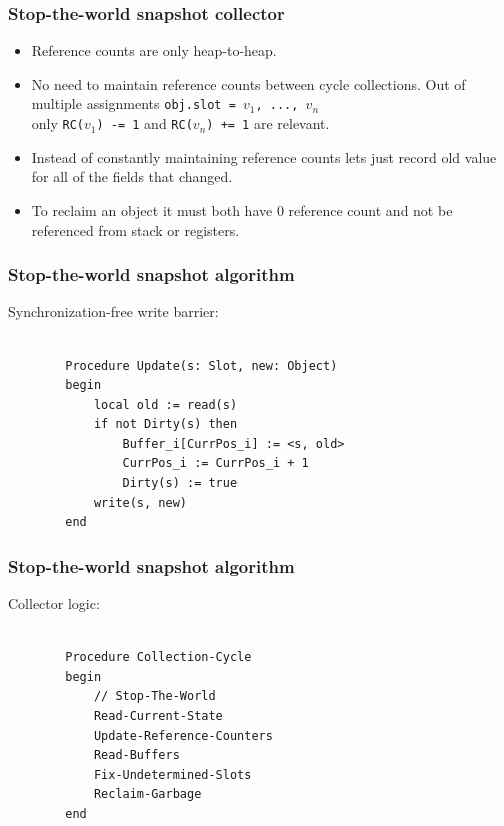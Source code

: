 \begin{frame}
    \frametitle{Stop-the-world snapshot collector}
    \begin{itemize}
        \item
            Reference counts are only heap-to-heap.
        \item
            No need to maintain reference counts between cycle collections.
            Out of multiple assignments \texttt{obj.slot = $v_1$, ..., $v_n$}
            \\ only \texttt{RC($v_1$) -= 1} and \texttt{RC($v_n$) += 1}
            are relevant.
        \item
            Instead of constantly maintaining reference counts lets
            just record old value for all of the fields that changed.
        \item
            To reclaim an object it must both have 0 reference count and
            not be referenced from stack or registers.
    \end{itemize}
\end{frame}

\begin{frame}[fragile]
    \frametitle{Stop-the-world snapshot algorithm}
    Synchronization-free write barrier:
    \begin{verbatim}

        Procedure Update(s: Slot, new: Object)
        begin
            local old := read(s)
            if not Dirty(s) then
                Buffer_i[CurrPos_i] := <s, old>
                CurrPos_i := CurrPos_i + 1
                Dirty(s) := true
            write(s, new)
        end
    \end{verbatim}
\end{frame}

\begin{frame}[fragile]
    \frametitle{Stop-the-world snapshot algorithm}
    Collector logic:
    \begin{verbatim}

        Procedure Collection-Cycle
        begin
            // Stop-The-World
            Read-Current-State
            Update-Reference-Counters
            Read-Buffers
            Fix-Undetermined-Slots
            Reclaim-Garbage
        end
    \end{verbatim}
\end{frame}

